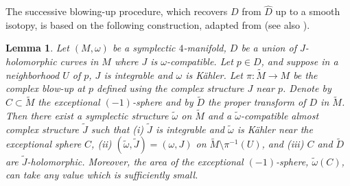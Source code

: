 \documentclass[11pt]{amsart}
\theoremstyle{plain}
\numberwithin{theorem}{section}
\newtheorem{lemma}[theorem]{Lemma}
\theoremstyle{definition}
\begin{document}
\vspace{2mm}

The successive blowing-up procedure, which recovers $D$ from $\hat{D}$ up to a smooth isotopy, is
based on the following construction, adapted from \cite{CFM} (see also \cite{C3}).

\begin{lemma}
Let $(M,\omega)$ be a symplectic $4$-manifold, $D$ be a union of $J$-holomorphic curves in $M$ where $J$ is $\omega$-compatible. Let $p\in D$, and suppose in a neighborhood $U$ of $p$, $J$ is
integrable and $\omega$ is K\"{a}hler. Let $\pi: \tilde{M}\rightarrow M$ be the complex blow-up at $p$ defined using the complex structure $J$ near $p$. Denote by $C\subset \tilde{M}$ the exceptional 
$(-1)$-sphere and by
$\tilde{D}$ the proper transform of $D$ in $\tilde{M}$. Then there exist a symplectic structure 
$\tilde{\omega}$ on $\tilde{M}$ and a $\tilde{\omega}$-compatible almost complex structure $\tilde{J}$ such that (i) $\tilde{J}$ is integrable and $\tilde{\omega}$ is K\"{a}hler near the exceptional sphere $C$, (ii) $(\tilde{\omega},\tilde{J})=(\omega,J)$ on $\tilde{M}\setminus \pi^{-1}(U)$, and (iii) 
$C$ and $\tilde{D}$ are $\tilde{J}$-holomorphic. Moreover, the area of the exceptional $(-1)$-sphere, 
$\tilde{\omega}(C)$, can take any value which is sufficiently small. 
\end{lemma}
\end{document}
